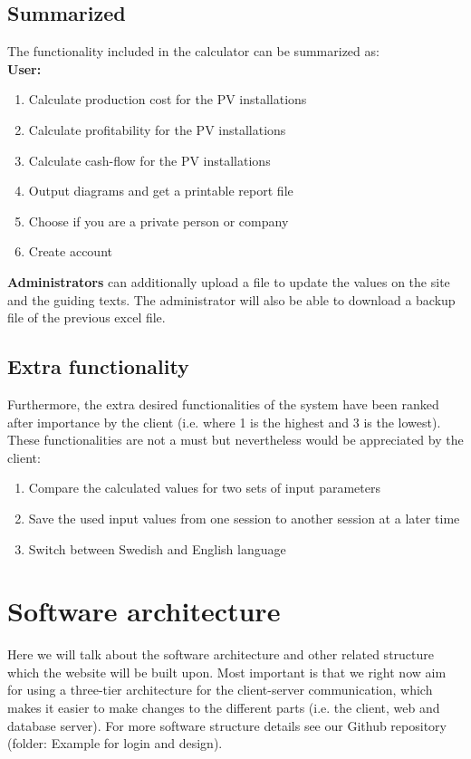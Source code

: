 \documentclass[]{article}
\begin{document}
\subsection{Summarized}
The functionality included in the calculator can be summarized as:\\
\textbf{User:}
\begin{enumerate}
	\item Calculate production cost for the PV installations
	\item Calculate profitability for the PV installations
	\item Calculate cash-flow for the PV installations
	\item Output diagrams and get a printable report file
	\item Choose if you are a private person or company
	\item Create account
\end{enumerate}
\textbf{Administrators} can additionally upload a file to update the values on the site and the guiding texts. The administrator will also be able to download a backup file of the previous excel file.

\subsection{Extra functionality}
Furthermore, the extra desired functionalities of the system have been ranked after importance by the client (i.e. where 1 is the highest and 3 is the lowest). These functionalities are not a must but nevertheless would be appreciated by the client: 

\begin{enumerate}
	\item Compare the calculated values for two sets of input parameters
	\item Save the used input values from one session to another session at a later time
	\item Switch between Swedish and English language
\end{enumerate}

\section{Software architecture}
Here we will talk about the software architecture and other related structure which the website will be built upon. Most important is that we right now aim for using a three-tier architecture for the client-server communication, which makes it easier to make changes to the different parts (i.e. the client, web and database server). For more software structure details see our Github repository (folder: Example for login and design).
\end{document}
